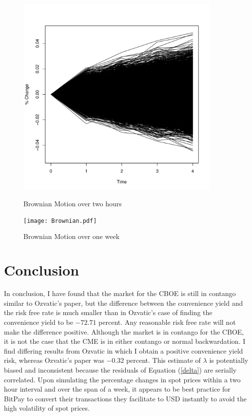 \documentclass{paper}
\let\oldref\ref
\renewcommand{\ref}[1]{(\oldref{#1})}
\begin{document}
\begin{doublespacing}
\begin{figure}[H]
    \centering
    \begin{minipage}{0.5\textwidth}
        \centering
        \includegraphics[width=0.9\textwidth]{2hrBrownian.pdf} %
        \caption{Brownian Motion over two hours}\label{2Brown}
    \end{minipage}\hfill
    \begin{minipage}{0.5\textwidth}
        \centering
        \texttt{[image: Brownian.pdf]} %
        \caption{Brownian Motion over one week}\label{weBrown}
    \end{minipage}
\end{figure}

\section{Conclusion}
In conclusion, I have found that the market for the CBOE is still in contango similar to Ozvatic's paper, but the difference between the convenience yield and the risk free rate is much smaller than in Ozvatic's case of finding the convenience yield to be $-72.71$ percent. Any reasonable risk free rate will not make the difference positive. Although the market is in contango for the CBOE, it is not the case that the CME is in either contango or normal backwardation. I find differing results from Ozvatic in which I obtain a positive convenience yield risk, whereas Ozvatic's paper was $-0.32$ percent. This estimate of $\lambda$ is potentially biased and inconsistent because the residuals of Equation \ref{delta} are serially correlated. Upon simulating the percentage changes in spot prices within a two hour interval and over the span of a week, it appears to be best practice for BitPay to convert their transactions they facilitate to USD instantly to avoid the high volatility of spot prices.

\end{doublespacing}
\newpage



\end{document}
